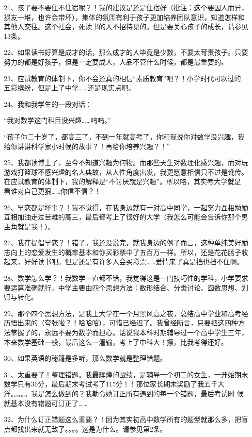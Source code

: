 \documentclass[11pt]{ctexart}
\begin{document}
{{{{21、孩子要不要住不住宿呢？！我的建议是还是住宿好（批注：这个要因人而异，
损友一堆，也许会带坏），集体的氛围有利于孩子更加培养团队意识，知道怎样和
其他人交往。这个社会，死读书的人不招待见的。但是要关心孩子的成长，请参见
13条。


22、如果读书好算是成才的话，那么成才的人毕竟是少数，不要太苛责孩子。只要
努力的都是好孩子，但是一定要成人，人品不管什么时候，都是最重要的。


23、应试教育的体制下，你不会还真的相信“素质教育”吧？！小学时代可以过的
五彩缤纷，但是上了中学……还是现实点吧。


24、我和我学生的一段对话：

“我对数学这门科目没兴趣……呜呜。”

“孩子你二十岁了，都高三了，不到一年就高考了，你和我说你对数学没兴趣，我
给你讲讲科学家小时候的故事？！再给你培养兴趣？！”


25、我都读博士了，至今不知道兴趣为何物。而那些天生对数理化感兴趣，而对玩
游戏打篮球不感兴趣的名人典故，从人性角度出发，我更愿意相信只不过是讹传。
在应试教育的体制下，我的解释是“不讨厌就是兴趣”。所以咯，其实考大学就是
看谁对自己更狠……你信不信？！


26、早恋都是坏事？！我不觉得，在我身边就有一对高中同学，一起努力互相勉励
互相加油走过苦难的高三，最后都考上了很好的大学（我怎么可能会告诉你那个男
主角就是我！）。


27、我在提倡早恋？！错了。我还没说完，就我身边的例子而言，这种单纯美好励
志向上的恋爱发生的概率基本和你买彩票中了五百万一样。所以，还是花花肠子收
起来，好好读书吧。但是还是有许多人会买彩票……爱情来了真是挡也挡不住啊。


28、数学怎么学？！我数学一直都不错，我觉得这是一门技巧性的学科，小学要求
要运算准确就行，中学主要由四个思想方法：数形结合、分类讨论、函数思想、划
归与转化。


29、那个四个思想方法，是我上大学在一个月黑风高之夜，总结高中学业和高考经
历悟出来的（夸张啦？！哈哈哈），可惜已经迟了。我曾经断言，只要把这四种方
法掌握了的，永远不要为数学而担心。话说我本科时期辅导过一个高中学生三年，
本来数学基础一般，最后这么一灌输，考上了中科大！擦，比我考得还好。


30、如果英语的秘籍是多听，那么数学就是整理错题。

31、太重要了！整理错题。我最辉煌的战绩，是辅导一个初二的女生，一开始期末
数学只有36分，最后期末考试考了115分！！那位家长期末奖励了我五千大
洋。。。。。我是怎么做到的？我勒令她订正所有遇到的每一个错题，最后考试时
候就基本没有错题可订正了……


32、为什么订正错题这么重要？！因为其实初高中数学所有的题型就那么多，把盲
点都找出来就无敌了。。。。这是为什么。请参见第2条。


}}}}
\end{document}
